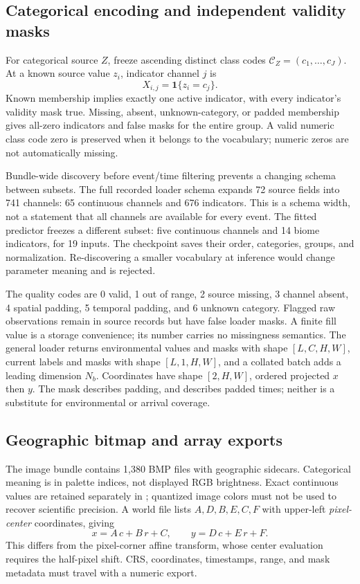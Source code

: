 \documentclass[11pt,a4paper]{article}
\newcommand{\Ind}{\mathbf{1}}
\begin{document}
\subsection{Categorical encoding and independent validity masks}
For categorical source $Z$, freeze ascending distinct class codes
$\mathcal C_Z=(c_1,\ldots,c_J)$. At a known source value $z_i$, indicator
channel $j$ is
\begin{equation}
X_{i,j}=\Ind\{z_i=c_j\}.
\end{equation}
Known membership implies exactly one active indicator, with every indicator's
validity mask true. Missing, absent, unknown-category, or padded membership
gives all-zero indicators and false masks for the entire group. A valid
numeric class code zero is preserved when it belongs to the vocabulary;
numeric zeros are not automatically missing.

Bundle-wide discovery before event/time filtering prevents a changing schema
between subsets. The full recorded loader schema expands 72 source fields
into 741 channels: 65 continuous channels and 676 indicators. This is a
schema width, not a statement that all channels are available for every event.
The fitted predictor freezes a different subset: five continuous channels
and 14 biome indicators, for 19 inputs. The checkpoint saves their order,
categories, groups, and normalization. Re-discovering a smaller vocabulary
at inference would change parameter meaning and is rejected.

The quality codes are 0 valid, 1 out of range, 2 source missing, 3 channel
absent, 4 spatial padding, 5 temporal padding, and 6 unknown category.
Flagged raw observations remain in source records but have false loader
masks. A finite fill value is a storage convenience; its number carries no
missingness semantics. The general loader returns environmental values and
masks with shape $[L,C,H,W]$, current labels and masks with shape $[L,1,H,W]$,
and a collated batch adds a leading dimension $N_b$. Coordinates have shape
$[2,H,W]$, ordered projected $x$ then $y$. The  mask
describes padding, and  describes padded times; neither is
a substitute for environmental or arrival coverage.

\subsection{Geographic bitmap and array exports}
The image bundle contains 1,380 BMP files with geographic sidecars. Categorical
meaning is in palette indices, not displayed RGB brightness. Exact continuous
values are retained separately in ; quantized image colors
must not be used to recover scientific precision. A world file lists
$A,D,B,E,C,F$ with upper-left \emph{pixel-center} coordinates, giving
\begin{equation}
x=A\,c+B\,r+C,\qquad y=D\,c+E\,r+F.
\end{equation}
This differs from the pixel-corner affine transform, whose center evaluation
requires the half-pixel shift. CRS, coordinates, timestamps, range, and mask
metadata must travel with a numeric export.
\end{document}

